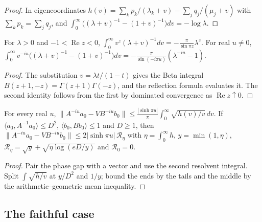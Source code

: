 \begin{proof}\leanok
    In eigencoordinates $h(v)=\sum_kp_k/(\lambda_k+v)-\sum_jq_j/(\mu_j+v)$ with
    $\sum_kp_k=\sum_jq_j$, and
    $\int_0^\infty\bigl((\lambda+v)^{-1}-(1+v)^{-1}\bigr)dv=-\log\lambda$.
\end{proof}

\begin{lemma}
    \label{lem:resolvent_mellin}
    \leanok
    For $\lambda>0$ and $-1<\operatorname{Re}z<0$,
    $\int_0^\infty v^z(\lambda+v)^{-1}dv=-\frac{\pi}{\sin\pi z}\lambda^z$. For
    real $u\ne0$,
    $\int_0^\infty v^{-iu}\bigl((\lambda+v)^{-1}-(1+v)^{-1}\bigr)dv
    =-\frac{\pi}{\sin(-i\pi u)}(\lambda^{-iu}-1)$.
\end{lemma}

\begin{proof}\leanok
    The substitution $v=\lambda t/(1-t)$ gives the Beta integral
    $B(z+1,-z)=\Gamma(z+1)\Gamma(-z)$, and the reflection formula evaluates it.
    The second identity follows from the first by dominated convergence as
    $\operatorname{Re}z\uparrow0$.
\end{proof}

\begin{theorem}
    \label{thm:resolvent_phase_gap}
    \leanok
    For every real $u$,
    $\lVert A^{-iu}a_0-VB^{-iu}b_0\rVert\le\frac{|\sinh\pi u|}{\pi}
    \int_0^\infty\sqrt{h(v)/v}\,dv$. If
    $\langle a_0,A^{-1}a_0\rangle\le D^2$, $\langle b_0,Bb_0\rangle\le1$ and
    $D\ge1$, then
    $\lVert A^{-iu}a_0-VB^{-iu}b_0\rVert\le2|\sinh\pi u|\,\mathcal R_\eta$ with
    $\eta=\int_0^\infty h$, $y=\min(1,\eta)$,
    $\mathcal R_\eta=\sqrt y+\sqrt{\eta\log(eD/y)}$ and $\mathcal R_0=0$.
\end{theorem}

\begin{proof}\leanok
    Pair the phase gap with a vector and use the second resolvent integral.
    Split $\int\sqrt{h/v}$ at $y/D^2$ and $1/y$; bound the ends by the tails
    and the middle by the arithmetic--geometric mean inequality.
\end{proof}

\subsection{The faithful case}

